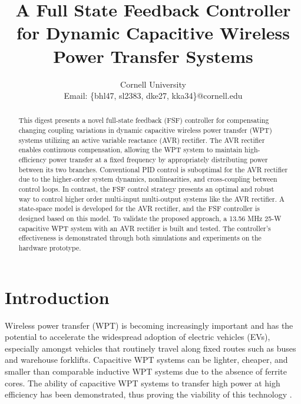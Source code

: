 \documentclass[conference, twocolumn, letterpaper]{IEEEtran}
\title{\singlespacing \fontsize{24}{29} A Full State Feedback Controller for Dynamic Capacitive Wireless Power Transfer Systems}
\author{
    \IEEEauthorblockN{Ben Liao, Sophia Lin, Dheeraj Etta, Khurram K. Afridi}
\IEEEauthorblockA{Department of Electrical and Computer Engineering}
        Cornell University \\
        Email: \{bhl47, sl2383, dke27, kka34\}@cornell.edu
}
\begin{document}
\maketitle

\vspace{-0.85cm}
\begin{abstract}
This digest presents a novel full-state feedback (FSF) controller for compensating changing coupling variations in dynamic capacitive wireless power transfer (WPT) systems utilizing an active variable reactance (AVR) rectifier. The AVR rectifier enables continuous compensation, allowing the WPT system to maintain high-efficiency power transfer at a fixed frequency by appropriately distributing power between its two branches. Conventional PID control is suboptimal for the AVR rectifier due to the higher-order system dynamics, nonlinearities, and cross-coupling between control loops. In contrast, the FSF control strategy presents an optimal and robust way to control higher order multi-input multi-output systems like the AVR rectifier. A state-space model is developed for the AVR rectifier, and the FSF controller is designed based on this model. To validate the proposed approach, a 13.56 MHz 25-W capacitive WPT system with an AVR rectifier is built and tested. The controller’s effectiveness is demonstrated through both simulations and experiments on the hardware prototype.
\end{abstract}

\vspace{0.5cm}

\section{Introduction}

Wireless power transfer (WPT) is becoming increasingly important and has the potential to accelerate the widespread adoption of electric vehicles (EVs), especially amongst vehicles that routinely travel along fixed routes such as buses and warehouse forklifts. Capacitive WPT systems can be lighter, cheaper, and smaller than comparable inductive WPT systems due to the absence of ferrite cores. The ability of capacitive WPT systems to transfer high power at high efficiency has been demonstrated, thus proving the viability of this technology \cite{2023_Maji_WPTCE}.
\end{document}
